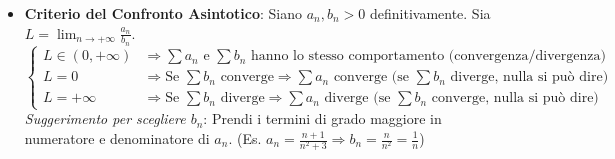 \documentclass[10pt, a4paper]{article}
\begin{document}
\begin{itemize}
            \item \textbf{Criterio del Confronto Asintotico}:
            Siano $a_n, b_n > 0$ definitivamente. Sia $L = \lim_{n\rightarrow +\infty}\frac{a_n}{b_n}$.
            \begin{equation*}
                \begin{cases}
                    L \in (0,+\infty) & \Rightarrow \sum a_n \text{ e } \sum b_n \text{ hanno lo stesso comportamento (convergenza/divergenza)} \\
                    L = 0 & \Rightarrow \text{Se } \sum b_n \text{ converge} \Rightarrow \sum a_n \text{ converge (se } \sum b_n \text{ diverge, nulla si può dire)} \\
                    L = +\infty & \Rightarrow \text{Se } \sum b_n \text{ diverge} \Rightarrow \sum a_n \text{ diverge (se } \sum b_n \text{ converge, nulla si può dire)}
                \end{cases}
            \end{equation*}
            \textit{Suggerimento per scegliere $b_n$}: Prendi i termini di grado maggiore in numeratore e denominatore di $a_n$. (Es. $a_n=\frac{n+1}{n^2+3} \Rightarrow b_n=\frac{n}{n^2}=\frac{1}{n}$)
        \end{itemize}
\end{document}
